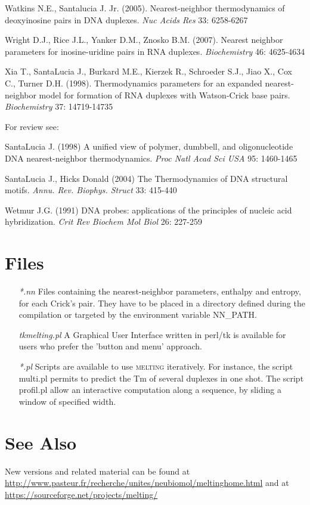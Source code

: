 \documentclass{article}
\begin{document}
Watkins N.E., Santalucia J. Jr. (2005). Nearest-neighbor thermodynamics of deoxyinosine 
pairs in DNA duplexes. \textit{Nuc Acids Res} 33: 6258-6267 

Wright D.J., Rice J.L., Yanker D.M., Znosko B.M. (2007). Nearest neighbor parameters for 
inosine-uridine pairs in RNA duplexes. \textit{Biochemistry} 46: 4625-4634

  Xia T., SantaLucia J., Burkard M.E., Kierzek 
R., Schroeder S.J., Jiao X., Cox C., Turner D.H. (1998). Thermodynamics parameters 
for an expanded nearest-neighbor model for formation of RNA duplexes with 
Watson-Crick base pairs. \textit{Biochemistry}  37: 14719-14735   

  For review see: 
  
  SantaLucia J. (1998) A unified view of polymer, dumbbell, and oligonucleotide 
DNA nearest-neighbor thermodynamics. \textit{Proc Natl Acad Sci USA}  95: 1460-1465 

SantaLucia  J., Hicks Donald (2004) The Thermodynamics of DNA structural motifs. 
\textit{Annu. Rev. Biophys. Struct} 33: 415-440 
  
  Wetmur J.G. (1991) DNA probes: applications of the principles of nucleic 
acid hybridization. \textit{Crit Rev Biochem Mol Biol} 26: 227-259   
   
\section{Files }
\begin{itemize}
\item [\textit{*.nn}] Files containing the nearest-neighbor parameters, enthalpy and entropy, 
for each Crick's pair.  They have to be placed in a directory defined during 
the compilation or targeted by the  environment variable NN\_PATH.  
\item [\textit{tkmelting.pl}] A Graphical User Interface written in perl/tk is available for users
who prefer  the 'button and menu' approach.  
\item [\textit{*.pl}] Scripts are available to 
use \textsc{melting} iteratively. For instance, the script multi.pl permits to predict 
the Tm of several duplexes in one shot. The script profil.pl allow
an interactive computation along a sequence, by sliding a window of specified width. 
  
\end{itemize}
 
\section{See Also }
New versions and 
related material can be found at \url{http://www.pasteur.fr/recherche/unites/neubiomol/meltinghome.html} 
and at \url{https://sourceforge.net/projects/melting/}
  
\end{document}
